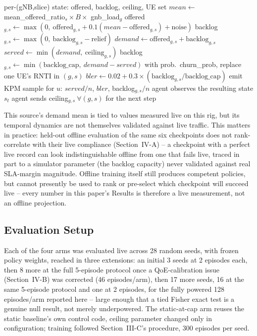 \documentclass[conference]{IEEEtran}
\begin{document}
\begin{algorithm}[t]
\caption{Offline closed-loop traffic simulation (one polling step, all gNBs/slices)}
\label{alg:sim}
\footnotesize
\begin{algorithmic}[1]
\REQUIRE per-(gNB,slice) state: offered, backlog, ceiling, UE set
  \STATE $mean \gets$ mean\_offered\_ratio$_s \times B \times$ gnb\_load$_g$
  \STATE offered$_{g,s} \gets \max(0,\ \text{offered}_{g,s} + 0.1(mean - \text{offered}_{g,s}) + \text{noise})$
    \STATE backlog$_{g,s} \gets \max(0,\ \text{backlog}_{g,s} - \text{relief})$
  \ENDIF
  \STATE $demand \gets \text{offered}_{g,s} + \text{backlog}_{g,s}$
  \STATE $served \gets \min(demand,\ \text{ceiling}_{g,s})$
  \STATE backlog$_{g,s} \gets \min(\text{backlog\_cap},\ demand - served)$
  \STATE with prob.\ churn\_prob, replace one UE's RNTI in $(g,s)$
  \STATE $bler \gets 0.02 + 0.3 \times (\text{backlog}_{g,s} / \text{backlog\_cap})$
    \STATE emit KPM sample for $u$: $served/n$, $bler$, backlog$_{g,s}/n$
  \ENDFOR
\ENDFOR
\STATE agent observes the resulting state $s_t$
\STATE agent sends ceiling$_{g,s}\ \forall (g,s)$ for the next step
\end{algorithmic}
\end{algorithm}

This source's demand mean is tied to values measured live on this
rig, but its temporal dynamics are not themselves validated against
live traffic. This matters in practice: held-out offline evaluation
of the same six checkpoints does not rank-correlate with their live
compliance (Section~IV-A) -- a checkpoint with a perfect live record
can look indistinguishable offline from one that fails live, traced
in part to a simulator parameter (the backlog capacity) never
validated against real SLA-margin magnitude. Offline training itself
still produces competent policies, but cannot presently be used to
rank or pre-select which checkpoint will succeed live -- every number
in this paper's Results is therefore a live measurement, not an
offline projection.

\subsection{Evaluation Setup}
Each of the four arms was evaluated live across 28 random seeds, with
frozen policy weights, reached in three extensions: an initial 3
seeds at 2 episodes each, then 8 more at the full 5-episode protocol
once a QoE-calibration issue (Section~IV-B) was corrected (46
episodes/arm), then 17 more seeds, 16 at the same 5-episode protocol
and one at 2 episodes, for the fully powered 128 episodes/arm reported
here -- large enough that a tied Fisher exact test is a genuine null
result, not merely underpowered.
The static-at-cap arm reuses the static baseline's own control code,
ceiling parameter changed only in configuration; training followed
Section~III-C's procedure, 300 episodes per seed.
\end{document}
